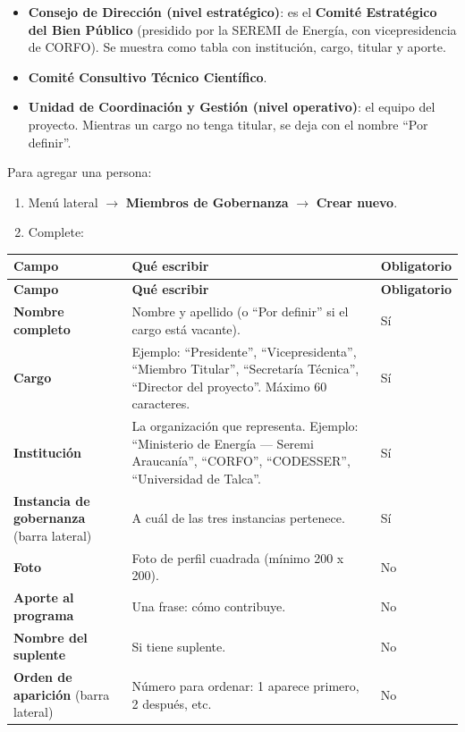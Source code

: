 \documentclass[11pt,letterpaper]{report}
\begin{document}
\begin{itemize}
  \item \textbf{Consejo de Dirección (nivel estratégico)}: es el \textbf{Comité Estratégico del Bien Público} (presidido por la SEREMI de Energía, con vicepresidencia de CORFO). Se muestra como tabla con institución, cargo, titular y aporte.
  \item \textbf{Comité Consultivo Técnico Científico}.
  \item \textbf{Unidad de Coordinación y Gestión (nivel operativo)}: el equipo del proyecto. Mientras un cargo no tenga titular, se deja con el nombre “Por definir”.
\end{itemize}
Para agregar una persona:

\begin{enumerate}
  \item Menú lateral $\rightarrow$ \textbf{Miembros de Gobernanza} $\rightarrow$ \textbf{Crear nuevo}.
  \item Complete:
\end{enumerate}
\begin{longtable}{>{\raggedright\arraybackslash}p{}>{\raggedright\arraybackslash}p{}>{\raggedright\arraybackslash}p{}}
\rowcolor{h2vazul}\textbf{\color{white}Campo} & \textbf{\color{white}Qué escribir} & \textbf{\color{white}Obligatorio} \\
\endfirsthead
\rowcolor{h2vazul}\textbf{\color{white}Campo} & \textbf{\color{white}Qué escribir} & \textbf{\color{white}Obligatorio} \\
\endhead
\textbf{Nombre completo} & Nombre y apellido (o “Por definir” si el cargo está vacante). & Sí \\ \midrule
\rowcolor{filaalt}\textbf{Cargo} & Ejemplo: “Presidente”, “Vicepresidenta”, “Miembro Titular”, “Secretaría Técnica”, “Director del proyecto”. Máximo 60 caracteres. & Sí \\ \midrule
\textbf{Institución} & La organización que representa. Ejemplo: “Ministerio de Energía — Seremi Araucanía”, “CORFO”, “CODESSER”, “Universidad de Talca”. & Sí \\ \midrule
\rowcolor{filaalt}\textbf{Instancia de gobernanza} (barra lateral) & A cuál de las tres instancias pertenece. & Sí \\ \midrule
\textbf{Foto} & Foto de perfil cuadrada (mínimo 200 x 200). & No \\ \midrule
\rowcolor{filaalt}\textbf{Aporte al programa} & Una frase: cómo contribuye. & No \\ \midrule
\textbf{Nombre del suplente} & Si tiene suplente. & No \\ \midrule
\rowcolor{filaalt}\textbf{Orden de aparición} (barra lateral) & Número para ordenar: 1 aparece primero, 2 después, etc. & No \\ \bottomrule
\end{longtable}
\end{document}
